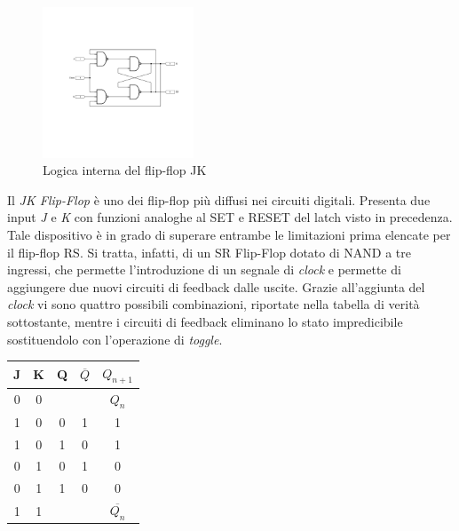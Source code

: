 \documentclass[journal]{IEEEtran}
\begin{document}
\begin{figure}[H]%
\centering
\begin{center}
\includegraphics[width=0.40\textwidth]{sch-simulations/digital/output/flip-flop-JK.pdf}
\end{center}
\caption{Logica interna del flip-flop JK}
\label{fig:circuit_JK}
\end{figure}

Il \textit{JK Flip-Flop} è uno dei  flip-flop più diffusi nei circuiti digitali. Presenta due input \textit{J} e \textit{K} con funzioni analoghe al SET e RESET del latch visto in precedenza. Tale dispositivo è in grado di superare entrambe le limitazioni prima elencate per il flip-flop RS. Si tratta, infatti, di un SR Flip-Flop dotato di NAND a tre ingressi, che permette l'introduzione di un segnale di \textit{clock} e permette di aggiungere due nuovi circuiti di feedback dalle uscite. Grazie all'aggiunta del \textit{clock} vi sono quattro possibili combinazioni, riportate nella tabella di verità sottostante, mentre i circuiti di feedback eliminano lo stato impredicibile sostituendolo con l'operazione di \textit{toggle}.
\newline
\begin{center}
\begin{tabular}{ |c|c|c|c|c| } 
 \hline
 \rowcolor{lightgray}
 J & K & Q & $\overline{Q}$ & $ Q_{n + 1} $ \\ \hline \hline
 0 & 0 &  &  & $Q_n$ \\ \hline
 1 & 0 & 0 & 1 & 1 \\ \hline
 1 & 0 & 1 & 0 & 1\\ \hline
 0 & 1 & 0 & 1 & 0 \\ \hline
 0 & 1 & 1 & 0 & 0 \\ \hline
 1 & 1 &  & & $\overline{Q_n}$ \\ \hline
\end{tabular}
\end{center}
\end{document}

